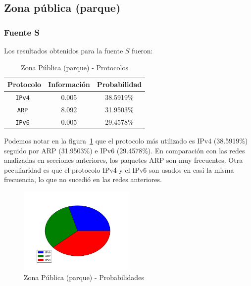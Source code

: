 \documentclass[final,inline,narroweqnarray,a4paper]{ieee}
\begin{document}


\subsection{Zona pública (parque)}
\subsubsection{Fuente S}

Los resultados obtenidos para la fuente $S$ fueron:

\begin{table}[H]
    \begin{center}
        \begin{tabular}{|c|c|c|}
            \hline
            \textbf{Protocolo} & \textbf{Información} & \textbf{Probabilidad} \\ \hline
            \texttt{IPv4      }& 0.005        & 38.5919\%    \\ \hline
            \texttt{ARP       }& 8.092        & 31.9503\%     \\ \hline
            \texttt{IPv6      }& 0.005        & 29.4578\%    \\ \hline
        \end{tabular}
        \caption{Zona Pública (parque) - Protocolos}
        \label{table:labosDcS}
    \end{center}
\end{table} 

Podemos notar en la figura~\ref{torta:parqueS} que el protocolo más utilizado es IPv4 (38.5919\%) seguido por ARP (31.9503\%) e IPv6 (29.4578\%). En comparación con las redes analizadas en secciones anteriores, los paquetes ARP son muy frecuentes. Otra peculiaridad es que el protocolo IPv4 y el IPv6 son usados en casi la misma frecuencia, lo que no sucedió en las redes anteriores.

\begin{figure}[H]
    \begin{center}
        \includegraphics[width=0.5\textwidth]{plot/parqueS-pie.png}
        \caption{Zona Pública (parque) - Probabilidades}
        \label{torta:parqueS}
    \end{center}
\end{figure}
\end{document}
